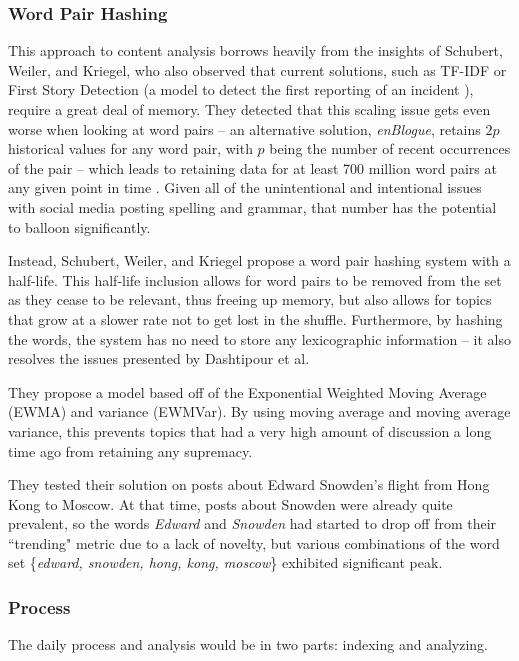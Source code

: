 \documentclass[preprint,review,12pt]{elsarticle}
\begin{document}
\subsubsection{Word Pair Hashing}
This approach to content analysis borrows heavily from the insights of Schubert, Weiler, and Kriegel, who also observed that current solutions, such as TF-IDF or First Story Detection (a model to detect the first reporting of an incident \cite{petrovic2010streaming,yang1998study}), require a great deal of memory. They detected that this scaling issue gets even worse when looking at word pairs -- an alternative solution, \textit{enBlogue}, retains $2p$ historical values for any word pair, with $p$ being the number of recent occurrences of the pair \cite{alvanaki2012see} -- which leads to retaining data for at least 700 million word pairs at any given point in time \cite{schubert2014signitrend}. Given all of the unintentional and intentional issues with social media posting spelling and grammar, that number has the potential to balloon significantly. 

Instead, Schubert, Weiler, and Kriegel propose a word pair hashing system with a half-life. This half-life inclusion allows for word pairs to be removed from the set as they cease to be relevant, thus freeing up memory, but also allows for topics that grow at a slower rate not to get lost in the shuffle. Furthermore, by hashing the words, the system has no need to store any lexicographic information -- it also resolves the issues presented by Dashtipour et al.

They propose a model based off of the Exponential Weighted Moving Average (EWMA) and variance (EWMVar). By using moving average and moving average variance, this prevents topics that had a very high amount of discussion a long time ago from retaining any supremacy. 

They tested their solution on posts about Edward Snowden's flight from Hong Kong to Moscow. At that time, posts about Snowden were already quite prevalent, so the words \textit{Edward} and \textit{Snowden} had started to drop off from their ``trending" metric due to a lack of novelty, but various combinations of the word set \{\textit{edward, snowden, hong, kong, moscow}\} exhibited significant peak. 

\subsubsection{Process}
The daily process and analysis would be in two parts: indexing and analyzing.
\end{document}
